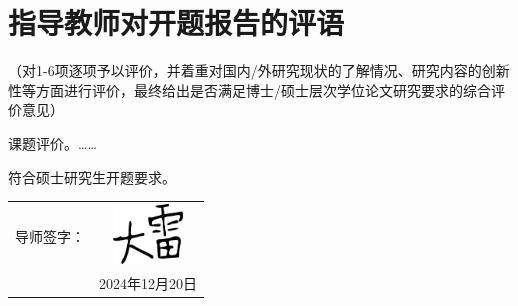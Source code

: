 \section{指导教师对开题报告的评语}\label{sec:advisorComments}
（对1-6项逐项予以评价，并着重对国内/外研究现状的了解情况、研究内容的创新性等方面进行评价，最终给出是否满足博士/硕士层次学位论文研究要求的综合评价意见）

课题评价。……

符合硕士研究生开题要求。
\vfill{}\,
\begin{flushright}
    \begin{tabular}{rr}
       导师签字： & \multicolumn{1}{c}{\includegraphics[width = 5em]{figure/dalei.pdf}} \\[10 mm]
            & 2024年12月20日 \\[30 mm]
    \end{tabular}%
\end{flushright}